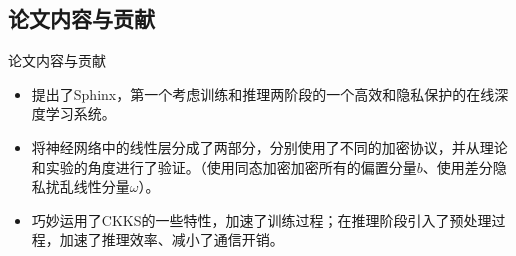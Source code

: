\documentclass{beamer}
\begin{document}
\subsection{论文内容与贡献}
\begin{frame}{论文内容与贡献}
	\begin{itemize}[<+-| alert@+>]
		\item 提出了Sphinx，第一个考虑训练和推理两阶段的一个高效和隐私保护的在线深度学习系统。
		\item 将神经网络中的线性层分成了两部分，分别使用了不同的加密协议，并从理论和实验的角度进行了验证。（使用同态加密加密所有的偏置分量$b$、使用差分隐私扰乱线性分量$\omega$）。
		\item 巧妙运用了CKKS的一些特性，加速了训练过程；在推理阶段引入了预处理过程，加速了推理效率、减小了通信开销。
	\end{itemize}
\end{frame}
\end{document}
